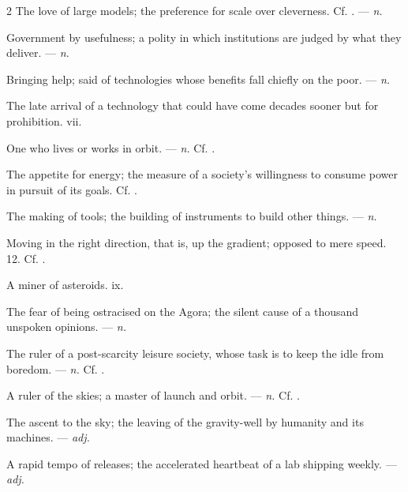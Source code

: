 \begin{multicols}{2}
 The love of large models; the preference for scale over cleverness. Cf. . —  \textit{n.}

 Government by usefulness; a polity in which institutions are judged by what they deliver. —  \textit{n.}

 Bringing help; said of technologies whose benefits fall chiefly on the poor. —  \textit{n.}

 The late arrival of a technology that could have come decades sooner but for prohibition.   vii.

 One who lives or works in orbit. —  \textit{n.} Cf. .

 The appetite for energy; the measure of a society's willingness to consume power in pursuit of its goals. Cf. .

 The making of tools; the building of instruments to build other things. —  \textit{n.}

 Moving in the right direction, that is, up the gradient; opposed to mere speed.   12. Cf. .

 A miner of asteroids.   ix.

 The fear of being ostracised on the Agora; the silent cause of a thousand unspoken opinions. —  \textit{n.}

 The ruler of a post-scarcity leisure society, whose task is to keep the idle from boredom. —  \textit{n.} Cf. .

 A ruler of the skies; a master of launch and orbit. —  \textit{n.} Cf. .

 The ascent to the sky; the leaving of the gravity-well by humanity and its machines. —  \textit{adj.}

 A rapid tempo of releases; the accelerated heartbeat of a lab shipping weekly. —  \textit{adj.}

\end{multicols}

